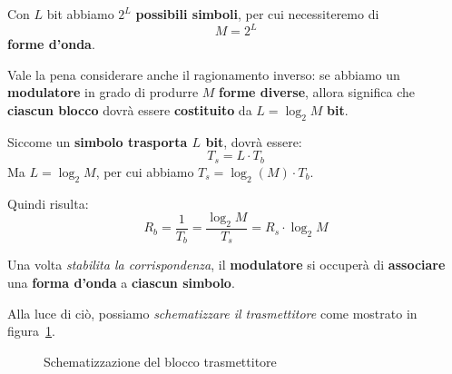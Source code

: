 Con $L$ bit abbiamo $2^L$ \textbf{possibili simboli}, per cui necessiteremo di
\[
    M = 2^L
\]
\textbf{forme d'onda}. 

Vale la pena considerare anche il ragionamento inverso: se abbiamo un 
\textbf{modulatore} in grado di produrre $M$ \textbf{forme diverse}, allora 
significa che \textbf{ciascun blocco} dovrà essere \textbf{costituito} da 
$L= \log_{2}M$ \textbf{bit}.

\begin{remark}
    Siccome un \textbf{simbolo trasporta $L$ bit}, dovrà essere:
    \[
        T_s = L\cdot T_b
    \] 
    Ma $L=\log_{2}M$, per cui abbiamo $T_s = \log_{2}(M) \cdot T_b$.
    
    Quindi risulta:
    \[
        R_b = \frac{1}{T_b} = \frac{\log_{2}M}{T_s} = R_s\cdot \log_{2}M
    \] 
\end{remark}


Una volta \textit{stabilita la corrispondenza}, il \textbf{modulatore} si
occuperà di \textbf{associare} una \textbf{forma d'onda} a \textbf{ciascun simbolo}.

Alla luce di ciò, possiamo \textit{schematizzare il trasmettitore} come mostrato
in figura~\ref{fig:08_02_TxMapMod}.

\begin{figure}[!ht]
    \centering
    \caption{Schematizzazione del blocco trasmettitore}
    \label{fig:08_02_TxMapMod}
\end{figure}

